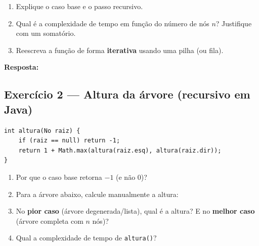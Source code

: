 \documentclass[12pt, a4paper]{article}
\newenvironment{resposta}{%
    \begin{mdframed}[linecolor=black!30, backgroundcolor=white,
                     innertopmargin=10pt, innerbottommargin=30pt,
                     skipabove=6pt]
    \textbf{Resposta:}\\[4pt]
}{%
    \end{mdframed}
}
\begin{document}
\begin{enumerate}[label=(\alph*)]
    \item Explique o caso base e o passo recursivo.
    \item Qual é a complexidade de tempo em função do número de nós $n$? Justifique com um somatório.
    \item Reescreva a função de forma \textbf{iterativa} usando uma pilha (ou fila).
\end{enumerate}

\begin{resposta}
\vspace{4cm}
\end{resposta}

\subsection*{Exercício 2 — Altura da árvore (recursivo em Java)}

\begin{lstlisting}[style=javastyle]
int altura(No raiz) {
    if (raiz == null) return -1;
    return 1 + Math.max(altura(raiz.esq), altura(raiz.dir));
}
\end{lstlisting}

\begin{enumerate}[label=(\alph*)]
    \item Por que o caso base retorna $-1$ (e não $0$)?
    \item Para a árvore abaixo, calcule manualmente a altura:

\begin{center}
\end{center}

    \item No \textbf{pior caso} (árvore degenerada/lista), qual é a altura? E no \textbf{melhor caso} (árvore completa com $n$ nós)?
    \item Qual a complexidade de tempo de \texttt{altura()}?
\end{enumerate}
\end{document}
